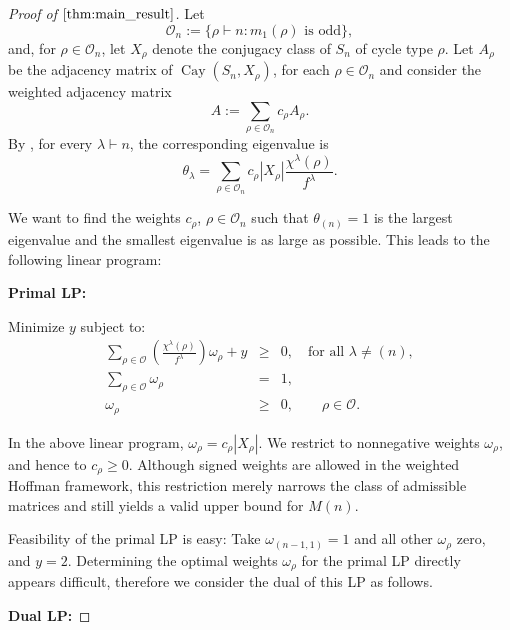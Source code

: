 \documentclass[10pt,a4paper]{amsart}
\newcommand{\Cay}{\operatorname{Cay}}
\newcommand{\OO}{\mathcal O}
\begin{document}
\begin{proof}[Proof of $\Cref{thm:main_result}$]
Let
$$
\mathcal{O}_n
:=
\{\rho\vdash n:m_1(\rho)\text{ is odd}\},
$$
and, for $\rho\in\mathcal{O}_n$, let $X_\rho$ denote the conjugacy class of
$S_n$ of cycle type $\rho$. 
Let $A_\rho$ be the adjacency matrix of $\Cay(S_n,X_\rho)$, for each $\rho\in \OO_n$ and consider the weighted adjacency matrix
$$
A
:=
\sum_{\rho\in\mathcal{O}_n}c_\rho A_\rho.
$$
By , for every
$\lambda\vdash n$, the corresponding eigenvalue is
$$
\theta_\lambda
=
\sum_{\rho\in\mathcal{O}_n}
c_\rho |X_\rho|\frac{\chi^\lambda(\rho)}{f^\lambda}.
$$

We want to find the weights $c_\rho$, $\rho\in \OO_n$ such that $\theta_{(n)}=1$ is the largest eigenvalue and the smallest eigenvalue is as large as possible. This leads to the following linear program:

\noindent\textbf{Primal LP:}

\noindent Minimize $y$ subject to:
\begin{eqnarray*}
    \sum_{\rho \in \OO} \left( \frac{\chi^{\lambda}(\rho) }{f^{\lambda}} \right) \omega_{\rho} + y &\ge& 0, \quad \text{for all } \lambda \neq (n),\\
    \sum_{\rho \in \OO} \omega_{\rho} &=& 1,\\
    \omega_\rho&\geq& 0, \qquad\rho\in\OO.
\end{eqnarray*}

In the above linear program, $\omega_\rho=c_\rho|X_\rho|$. We restrict to nonnegative weights $\omega_\rho$, and hence to $c_\rho\geq 0$. Although signed weights are allowed in the weighted Hoffman framework, this restriction merely narrows the class of admissible matrices and still yields a valid upper bound for $M(n)$.

Feasibility of the primal LP is easy: Take $\omega_{(n-1,1)}=1$ and all other $\omega_\rho$ zero, and $y=2$. Determining the optimal weights
$\omega_\rho$ for the primal LP directly appears difficult, therefore we consider the dual of this LP as follows.


\noindent\textbf{Dual LP:}


\end{proof}
\end{document}
